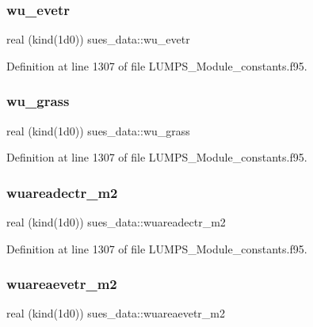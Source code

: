 \subsubsection{\texorpdfstring{wu\+\_\+evetr}{wu\_evetr}}
{\footnotesize\ttfamily real (kind(1d0)) sues\+\_\+data\+::wu\+\_\+evetr}



Definition at line 1307 of file L\+U\+M\+P\+S\+\_\+\+Module\+\_\+constants.\+f95.

\mbox{\label{namespacesues__data_a56315a7303bf70155e92ead9b64493c2}} 
\subsubsection{\texorpdfstring{wu\+\_\+grass}{wu\_grass}}
{\footnotesize\ttfamily real (kind(1d0)) sues\+\_\+data\+::wu\+\_\+grass}



Definition at line 1307 of file L\+U\+M\+P\+S\+\_\+\+Module\+\_\+constants.\+f95.

\mbox{\label{namespacesues__data_a3dd16ee1aeeae265f322b0982f33a321}} 
\subsubsection{\texorpdfstring{wuareadectr\+\_\+m2}{wuareadectr\_m2}}
{\footnotesize\ttfamily real (kind(1d0)) sues\+\_\+data\+::wuareadectr\+\_\+m2}



Definition at line 1307 of file L\+U\+M\+P\+S\+\_\+\+Module\+\_\+constants.\+f95.

\mbox{\label{namespacesues__data_a167fa54ed7df9e23b3dac81232961fa3}} 
\subsubsection{\texorpdfstring{wuareaevetr\+\_\+m2}{wuareaevetr\_m2}}
{\footnotesize\ttfamily real (kind(1d0)) sues\+\_\+data\+::wuareaevetr\+\_\+m2}



